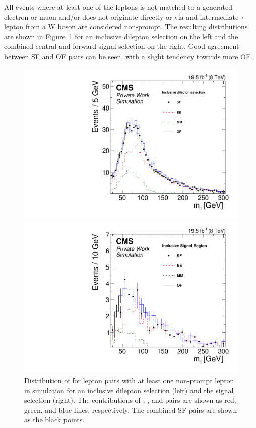 All events where at least one of the leptons is not matched to a generated electron or muon and/or does not originate directly or via and intermediate $\tau$ lepton from a W boson are considered non-prompt. The resulting \mll distributions are shown in Figure~\ref{fig:nonPromptMC} for an inclusive dilepton selection on the left and the combined central and forward signal selection on the right. Good agreement between SF and OF pairs can be seen, with a slight tendency towards more OF. 
\begin{figure}[htbp]
\centering
\begin{minipage}[t]{0.49\textwidth}
  \includegraphics[width=\textwidth]{plots/BG/nonPrompt/nonPromptMC_Inclusive_Full2012_Mll_None.pdf}
\end{minipage}
\begin{minipage}[t]{0.49\textwidth}
\includegraphics[width=\textwidth]{plots/BG/nonPrompt/nonPromptMC_SignalInclusive_Full2012_Mll_None.pdf}
\end{minipage}
\caption{Distribution of \mll for lepton pairs with at least one non-prompt lepton in simulation for an inclusive dilepton selection (left) and the signal selection (right). The contributions of \EE, \MM, and \EM pairs are shown as red, green, and blue lines, respectively. The combined SF pairs are shown as the black points.}
\label{fig:nonPromptMC}
\end{figure} 
